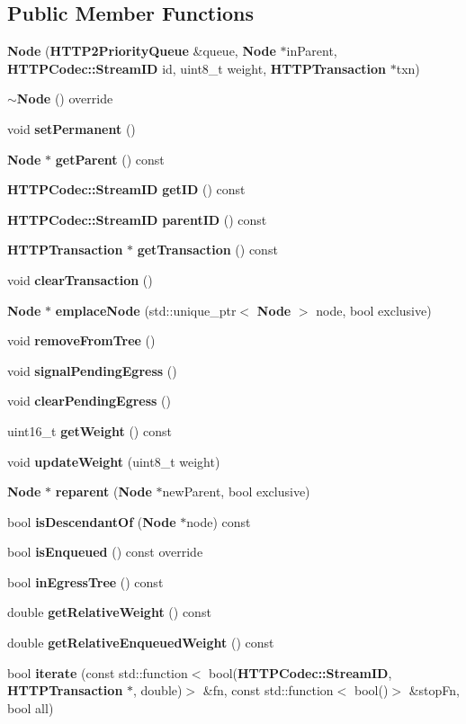 \subsection*{Public Member Functions}
\begin{DoxyCompactItemize}
\item 
{\bf Node} ({\bf H\+T\+T\+P2\+Priority\+Queue} \&queue, {\bf Node} $\ast$in\+Parent, {\bf H\+T\+T\+P\+Codec\+::\+Stream\+ID} id, uint8\+\_\+t weight, {\bf H\+T\+T\+P\+Transaction} $\ast$txn)
\item 
{\bf $\sim$\+Node} () override
\item 
void {\bf set\+Permanent} ()
\item 
{\bf Node} $\ast$ {\bf get\+Parent} () const 
\item 
{\bf H\+T\+T\+P\+Codec\+::\+Stream\+ID} {\bf get\+ID} () const 
\item 
{\bf H\+T\+T\+P\+Codec\+::\+Stream\+ID} {\bf parent\+ID} () const 
\item 
{\bf H\+T\+T\+P\+Transaction} $\ast$ {\bf get\+Transaction} () const 
\item 
void {\bf clear\+Transaction} ()
\item 
{\bf Node} $\ast$ {\bf emplace\+Node} (std\+::unique\+\_\+ptr$<$ {\bf Node} $>$ node, bool exclusive)
\item 
void {\bf remove\+From\+Tree} ()
\item 
void {\bf signal\+Pending\+Egress} ()
\item 
void {\bf clear\+Pending\+Egress} ()
\item 
uint16\+\_\+t {\bf get\+Weight} () const 
\item 
void {\bf update\+Weight} (uint8\+\_\+t weight)
\item 
{\bf Node} $\ast$ {\bf reparent} ({\bf Node} $\ast$new\+Parent, bool exclusive)
\item 
bool {\bf is\+Descendant\+Of} ({\bf Node} $\ast$node) const 
\item 
bool {\bf is\+Enqueued} () const override
\item 
bool {\bf in\+Egress\+Tree} () const 
\item 
double {\bf get\+Relative\+Weight} () const 
\item 
double {\bf get\+Relative\+Enqueued\+Weight} () const 
\item 
bool {\bf iterate} (const std\+::function$<$ bool({\bf H\+T\+T\+P\+Codec\+::\+Stream\+ID}, {\bf H\+T\+T\+P\+Transaction} $\ast$, double)$>$ \&fn, const std\+::function$<$ bool()$>$ \&stop\+Fn, bool all)

\end{DoxyCompactItemize}
